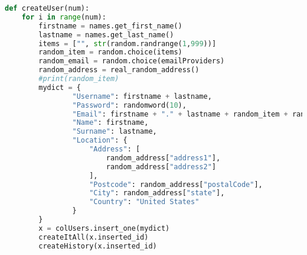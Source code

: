 \begin{lstlisting}[language=Python, caption=Showcase of createUser function]
def createUser(num):
    for i in range(num):
        firstname = names.get_first_name()
        lastname = names.get_last_name()
        items = ["", str(random.randrange(1,999))]
        random_item = random.choice(items)
        random_email = random.choice(emailProviders)
        random_address = real_random_address()
        #print(random_item)
        mydict = {
                "Username": firstname + lastname,
                "Password": randomword(10),
                "Email": firstname + "." + lastname + random_item + random_email,
                "Name": firstname,
                "Surname": lastname,
                "Location": {
                    "Address": [
                        random_address["address1"],
                        random_address["address2"]
                    ],
                    "Postcode": random_address["postalCode"],
                    "City": random_address["state"],
                    "Country": "United States"
                }
        }
        x = colUsers.insert_one(mydict)
        createItAll(x.inserted_id)
        createHistory(x.inserted_id)
\end{lstlisting}